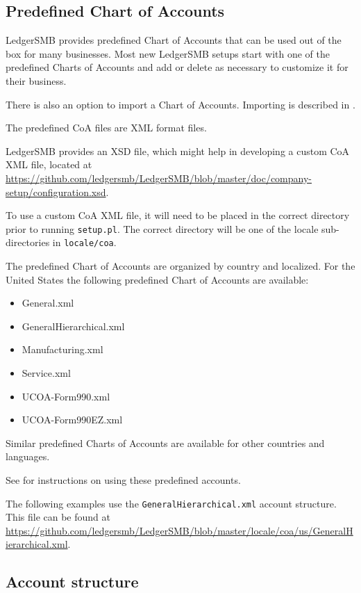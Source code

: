 \subsection{Predefined Chart of Accounts}
\label{sec-coa-predefined}

LedgerSMB provides predefined Chart of Accounts that can be used out of the box for many businesses.
Most new LedgerSMB setups start with one of the predefined Charts of Accounts and add or delete as necessary to customize it for their business.


There is also an option to import a Chart of Accounts. Importing is described in .

The predefined \gls{CoA} files are \gls{XML} format files.

LedgerSMB provides an \gls{XSD} file, which might help in developing a custom CoA XML file,  located at \url{https://github.com/ledgersmb/LedgerSMB/blob/master/doc/company-setup/configuration.xsd}.  

To use a custom \gls{CoA} \gls{XML} file, it will need to be placed in the correct directory prior to running \texttt{setup.pl}. The correct directory will be one of the locale sub-directories in \texttt{locale/coa}.

The predefined Chart of Accounts are organized by country and localized. For the United States the following predefined Chart of Accounts are available:
\begin{itemize}
    \item General.xml
    \item GeneralHierarchical.xml
    \item Manufacturing.xml
    \item Service.xml
    \item UCOA-Form990.xml
    \item UCOA-Form990EZ.xml
\end{itemize}

Similar predefined Charts of Accounts are available for other countries and languages.

See  for instructions on using these predefined accounts.

The following examples use the \texttt{GeneralHierarchical.xml} account structure.
This file can be found at \url{https://github.com/ledgersmb/LedgerSMB/blob/master/locale/coa/us/GeneralHierarchical.xml}.

\subsection{Account structure}
\label{sec-coa-accounts-structure}

